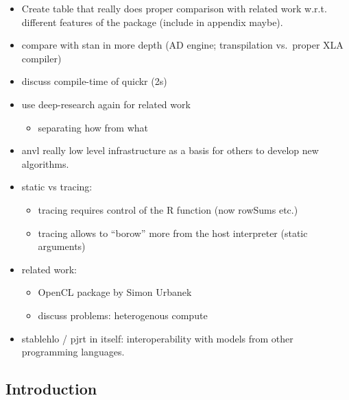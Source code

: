\begin{itemize}
  \begin{itemize}
  \tightlist
  \item[$\square$]
    despite compiler overhead --\textgreater{} better scaling to expensive problems / large datases
  \end{itemize}
\item[$\square$]
  Create table that really does proper comparison with related work w.r.t. different features of the package (include in appendix maybe).
\item[$\square$]
  compare with stan in more depth (AD engine; transpilation vs.~proper XLA compiler)
\item[$\square$]
  discuss compile-time of quickr (2s)
\item[$\square$]
  use deep-research again for related work

  \begin{itemize}
  \tightlist
  \item[$\boxtimes$]
    separating how from what
  \end{itemize}
\item[$\boxtimes$]
  anvl really low level infrastructure as a basis for others to develop new algorithms.
\item[$\square$]
  static vs tracing:

  \begin{itemize}
  \tightlist
  \item[$\square$]
    tracing requires control of the R function (now rowSums etc.)
  \item[$\square$]
    tracing allows to ``borow'' more from the host interpreter (static arguments)
  \end{itemize}
\item[$\boxtimes$]
  related work:

  \begin{itemize}
  \tightlist
  \item[$\boxtimes$]
    OpenCL package by Simon Urbanek
  \item[$\boxtimes$]
    discuss problems: heterogenous compute
  \end{itemize}
\item[$\boxtimes$]
  stablehlo / pjrt in itself: interoperability with models from other programming languages.
\end{itemize}

\subsection{Introduction}\label{introduction}

